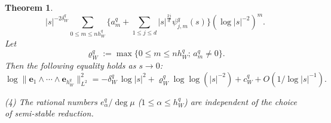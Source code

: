 \documentclass[amscd, leqno]{amsart}
\theoremstyle{plain}
\newtheorem{theorem}{Theorem}[section]
\theoremstyle{definition}
\theoremstyle{remark}
\begin{document}
\begin{theorem}
\begin{equation}
|s|^{-2\delta_{W}^{q}} \sum_{0\leq m \leq n h_{W}^{q}} \{ a_{m}^{q} 
+ \sum_{1 \leq j \leq d} |s|^{\frac{2j}{d}} \psi_{j,m}^{q}(s) \} (\log |s|^{-2})^{m}. 
\end{equation}
Let
\begin{equation}
\label{eqn:rho:q}
\varrho_{W}^{q} := \max\{ 0 \leq m \leq n h_{W}^{q};\, a_{m}^{q} \not=0 \}.
\end{equation}
Then the following equality holds as $s\to 0$:
\begin{equation}
\label{eqn:asymptotoc:L2:X}
\log\| {\mathbf e}_{1}\wedge \cdots\wedge {\mathbf e}_{h_{W}^{q}} \|_{L^{2}}^{2} 
= -\delta_{W}^{q}\,\log |s|^{2} + \varrho_{W}^{q}\log\log(|s|^{-2}) + c_{W}^{q} + O\left(1/\log |s|^{-1} \right).
\end{equation}
\par{\rm (4) }
The rational numbers $e^{q}_{\alpha}/\deg \mu$ ($1 \leq \alpha \leq h_{W}^{q}$) are independent of the choice of semi-stable reduction.
\end{theorem}
\end{document}
